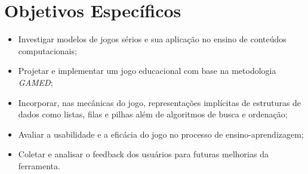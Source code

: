 \section{Objetivos Específicos}


\begin{itemize}
  \item Investigar modelos de jogos sérios e sua aplicação no ensino de conteúdos computacionais;
  \item Projetar e implementar um jogo educacional com base na metodologia \emph{GAMED};
  \item Incorporar, nas mecânicas do jogo, representações implícitas de estruturas de dados como listas, filas e pilhas além de algoritmos de busca e ordenação;
  \item Avaliar a usabilidade e a eficácia do jogo no processo de ensino-aprendizagem;
  \item Coletar e analisar o feedback dos usuários para futuras melhorias da ferramenta.
\end{itemize}
